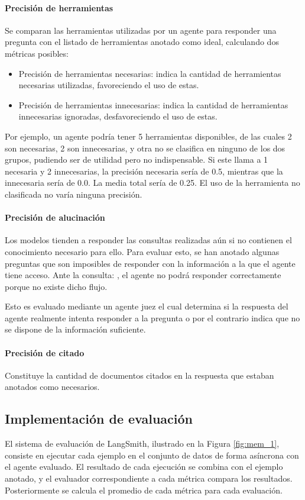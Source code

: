 \paragraph{Precisión de herramientas} Se comparan las herramientas utilizadas por un agente para responder una pregunta con el listado de herramientas anotado como ideal, calculando dos métricas posibles:

\begin{itemize}
\item Precisión de herramientas necesarias: indica la cantidad de herramientas necesarias utilizadas, favoreciendo el uso de estas.
\item Precisión de herramientas innecesarias: indica la cantidad de herramientas innecesarias ignoradas, desfavoreciendo el uso de estas.
\end{itemize}

Por ejemplo, un agente podría tener 5 herramientas disponibles, de las cuales 2 son necesarias, 2 son innecesarias, y otra no se clasifica en ninguno de los dos grupos, pudiendo ser de utilidad pero no indispensable. Si este llama a 1 necesaria y 2 innecesarias, la precisión necesaria sería de 0.5, mientras que la innecesaria sería de 0.0. La media total sería de 0.25. El uso de la herramienta no clasificada no varía ninguna precisión.

\paragraph{Precisión de alucinación} Los modelos tienden a responder las consultas realizadas aún si no contienen el conocimiento necesario para ello. Para evaluar esto, se han anotado algunas preguntas que son imposibles de responder con la información a la que el agente tiene acceso. Ante la consulta: , el agente no podrá responder correctamente porque no existe dicho flujo.

Esto es evaluado mediante un agente juez el cual determina si la respuesta del agente realmente intenta responder a la pregunta o por el contrario indica que no se dispone de la información suficiente.

\paragraph{Precisión de citado} Constituye la cantidad de documentos citados en la respuesta que estaban anotados como necesarios.


\subsection{Implementación de evaluación}
\label{sec:langsmith}
El sistema de evaluación de LangSmith, ilustrado en la Figura \ref{fig:mem_1}, consiste en ejecutar cada ejemplo en el conjunto de datos de forma asíncrona con el agente evaluado. El resultado de cada ejecución se combina con el ejemplo anotado, y el evaluador correspondiente a cada métrica compara los resultados. Posteriormente se calcula el promedio de cada métrica para cada evaluación.

